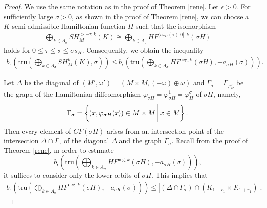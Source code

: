 \documentclass[12pt]{amsart}
\def\bigmid{\ \rule[-3.5mm]{0.1mm}{9mm}\ }
\theoremstyle{definition}
\begin{document}
\begin{proof}
We use the same notation as in the proof of Theorem \ref{rene}. Let $\epsilon>0$. For sufficiently large $\sigma>0$, as shown in the proof of Theorem \ref{rene}, we can choose a $K$-semi-admissible Hamiltonian function $H$ such that the isomorphism 
\begin{align*}
    \bigoplus_{k \in A_\sigma} SH^{>-\tau,k}_M(K) \cong \bigoplus_{k \in A_\sigma} HF^{(a_{\sigma H}(\tau),0],k}(\sigma H)
\end{align*}
holds for $0\leq \tau\leq\sigma \leq \sigma s_H$. Consequently, we obtain the inequality 
\begin{align*}
    b_{\epsilon} \left( \textrm{tru}\left( \bigoplus_{k \in A_\sigma} SH^{k}_M(K),\sigma \right) \right) \leq b_{\epsilon} \left( \textrm{tru}\left(\bigoplus_{k \in A_\sigma}HF^{\textrm{neg},k}(\sigma H),-a_{\sigma H}(\sigma)\right) \right).
\end{align*}

\vspace{0.2cm}

Let $\Delta$ be the diagonal of $(M', \omega') = ( M \times M,(-\omega)\oplus \omega)$ and $\Gamma_{\sigma} = \Gamma_{\varphi_H^{\sigma}}$ be the graph of the Hamiltonian diffeomorphism $\varphi_{\sigma H} = \varphi_{\sigma H}^1 = \varphi_H^{\sigma}$ of $\sigma H$, namely,
    \begin{align*}
        \Gamma_{\sigma} = \left\{ (x, \varphi_{\sigma H}(x)) \in M \times M \bigmid x\in M \right\}.
        \end{align*}
        Then every element of $CF(\sigma H)$ arises from an intersection point of the intersection $\Delta \cap \Gamma_{\sigma}$ of the diagonal $\Delta$ and the graph $\Gamma_\sigma$. Recall from the proof of Theorem \ref{rene}, in order to estimate $$b_{\epsilon} \left( \textrm{tru}\left(\bigoplus_{k \in A_\sigma}HF^{\textrm{neg},k}(\sigma H),-a_{\sigma H}(\sigma)\right) \right),$$
        it suffices to consider only the lower orbits of $\sigma H$. This implies that
\begin{align*}
    b_{\epsilon} \left( \textrm{tru}\left(\bigoplus_{k \in A_\sigma}HF^{\textrm{neg},k}(\sigma H),-a_{\sigma H}(\sigma)\right) \right) \leq \left| (\Delta \cap \Gamma_\sigma )\cap (K_{1+r_1} \times K_{1+r_1})  \right|.
\end{align*}

\vspace{0.2cm}


\end{proof}
\end{document}
